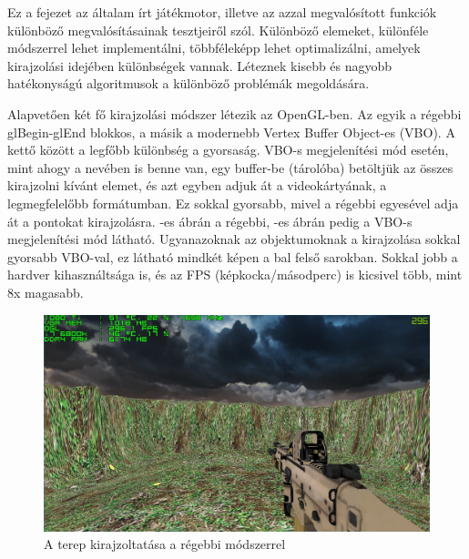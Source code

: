 \label{Chap:tesztek}

Ez a fejezet az általam írt játékmotor, illetve az azzal megvalósított funkciók különböző megvalósításainak tesztjeiről szól. Különböző elemeket, különféle módszerrel lehet implementálni, többféleképp lehet optimalizálni, amelyek kirajzolási idejében különbségek vannak. Léteznek kisebb és nagyobb hatékonyságú algoritmusok a különböző problémák megoldására.


Alapvetően két fő kirajzolási módszer létezik az OpenGL-ben. Az egyik a régebbi glBegin-glEnd blokkos, a másik a modernebb Vertex Buffer Object-es (VBO). A kettő között a legfőbb különbség a gyorsaság. VBO-s megjelenítési mód esetén, mint ahogy a nevében is benne van, egy buffer-be (tárolóba) betöltjük az összes kirajzolni kívánt elemet, és azt egyben adjuk át a videokártyának, a legmegfelelőbb formátumban. Ez sokkal gyorsabb, mivel a régebbi egyesével adja át a pontokat kirajzolásra. -es ábrán a régebbi, -es  ábrán pedig a VBO-s megjelenítési mód látható. Ugyanazoknak az objektumoknak a kirajzolása sokkal gyorsabb VBO-val, ez látható mindkét képen a bal felső sarokban. Sokkal jobb a hardver kihasználtsága is, és az FPS (képkocka/másodperc) is kicsivel több, mint 8x magasabb.

\begin{figure}[h]
\centering
\includegraphics[scale=0.38]{kepek/old_method_fps.png}
\caption{A terep kirajzoltatása a régebbi módszerrel}
\label{fig:old_fps}
\end{figure}

